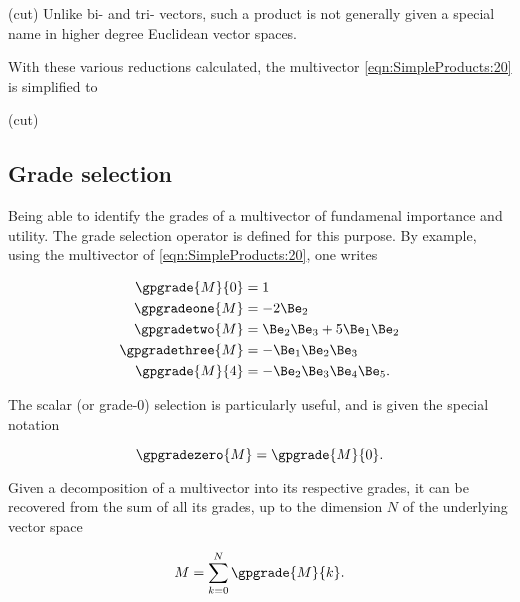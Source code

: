 (cut)
Unlike bi- and tri- vectors, such a product is not generally given a special name in higher degree Euclidean vector spaces.

With these various reductions calculated, the multivector \cref{eqn:SimpleProducts:20} is simplified to

(cut)

\subsection{Grade selection}

Being able to identify the grades of a multivector of fundamenal importance and utility.
The grade selection operator is defined for this purpose.
By example, using the multivector of \cref{eqn:SimpleProducts:20}, one writes

\begin{dmath}\label{eqn:SimpleProducts:140}
\begin{aligned}
   \gpgrade{M}{0} &= 1 \\
   \gpgradeone{M} &= - 2 \Be_2 \\
   \gpgradetwo{M} &= \Be_2 \Be_3 + 5 \Be_1 \Be_2 \\
   \gpgradethree{M} &= - \Be_1 \Be_2 \Be_3 \\
   \gpgrade{M}{4} &= -\Be_2 \Be_3 \Be_4 \Be_5.
\end{aligned}
\end{dmath}

The scalar (or grade-0) selection is particularly useful, and is given the special notation

\begin{dmath}\label{eqn:SimpleProducts:180}
\gpgradezero{M} = \gpgrade{M}{0}.
\end{dmath}

Given a decomposition of a multivector into its respective grades, it can be recovered from the sum of all its grades, up to the dimension \( N \) of the underlying vector space

\begin{dmath}\label{eqn:SimpleProducts:160}
   M = \sum_{k = 0}^N \gpgrade{M}{k}.
\end{dmath}
